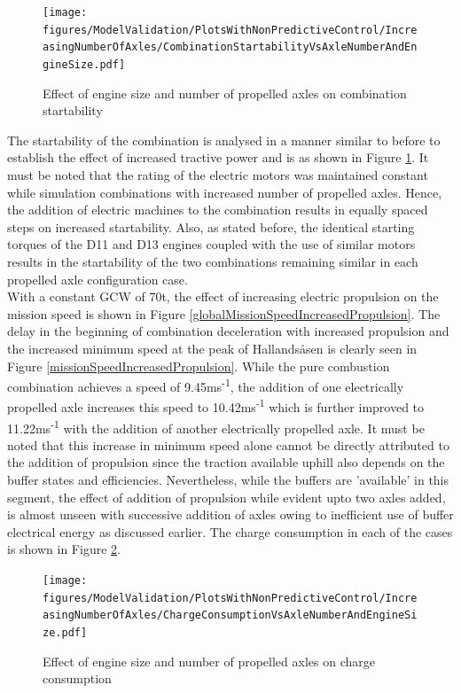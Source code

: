 \documentclass[ExampleMasters.tex]{subfiles}
\begin{document}
\begin{figure}
\centering
\texttt{[image: figures/ModelValidation/PlotsWithNonPredictiveControl/IncreasingNumberOfAxles/CombinationStartabilityVsAxleNumberAndEngineSize.pdf]}
\caption{Effect of engine size and number of propelled axles on combination startability}
\label{startabilityEngineNumberOfAxles}
\end{figure}
The startability of the combination is analysed in a manner similar to before to establish the effect of increased tractive power and is as shown in Figure \ref{startabilityEngineNumberOfAxles}. It must be noted that the rating of the electric motors was maintained constant while simulation combinations with increased number of propelled axles. Hence, the addition of electric machines to the combination results in equally spaced steps on increased startability. Also, as stated before, the identical starting torques of the D11 and D13 engines coupled with the use of similar motors results in the startability of the two combinations remaining similar in each propelled axle configuration case.\\
With a constant GCW of 70t, the effect of increasing electric propulsion on the mission speed is shown in Figure \ref{globalMissionSpeedIncreasedPropulsion}. The delay in the beginning of combination deceleration with increased propulsion and the increased minimum speed at the peak of Hallands\aa sen is clearly seen in Figure \ref{missionSpeedIncreasedPropulsion}. While the pure combustion combination achieves a speed of 9.45ms\textsuperscript{-1}, the addition of one electrically propelled axle increases this speed to 10.42ms\textsuperscript{-1} which is further improved to 11.22ms\textsuperscript{-1} with the addition of another electrically propelled axle. It must be noted that this increase in minimum speed alone cannot be directly attributed to the addition of propulsion since the traction available uphill also depends on the buffer states and efficiencies. Nevertheless, while the buffers are 'available' in this segment, the effect of addition of propulsion while evident upto two axles added, is almost unseen with successive addition of axles owing to inefficient use of buffer electrical energy as discussed earlier. The charge consumption in each of the cases is shown in Figure \ref{chargeEngineSizeNumberOfAxles}.
\begin{figure}
\centering
\texttt{[image: figures/ModelValidation/PlotsWithNonPredictiveControl/IncreasingNumberOfAxles/ChargeConsumptionVsAxleNumberAndEngineSize.pdf]}
\caption{Effect of engine size and number of propelled axles on charge consumption}
\label{chargeEngineSizeNumberOfAxles}
\end{figure}
\end{document}
